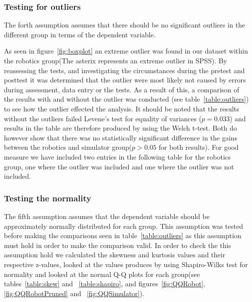 \subsubsection*{Testing for outliers}\label{sec:outliers}
The forth assumption assumes that there should be no significant outliers in the different group in terms of the dependent variable. 


\bigskip\noindent
As seen in figure~\ref{fig:boxplot} an extreme outlier was found in our dataset within the robotics group(The asterix represents an extreme outlier in SPSS). 
By reassessing the tests, and investigating the circumstances during the pretest and posttest it was determined that the outlier were most likely not caused by errors during assessment, data entry or the tests. 
As a result of this, a comparison of the results with and without the outlier was conducted (see table~\ref{table:outliers}) to see how the outlier effected the analysis. 
It should be noted that the results without the outliers failed Levene's test for equality of variances ($p = 0.033$) and results in the table are therefore produced by using the Welch t-test. 
Both do however show that there was no statistically significant difference in the gains between the robotics and simulator group($p > 0.05$ for both results).
For good measure we have included two entries in the following table for the robotics group, one where the outlier was included and one where the outlier was not included.


\bigskip\noindent
{}

\subsubsection*{Testing the normality}\label{sec:normality}
The fifth assumption assumes that the dependent variable should be approximately normally distributed for each group. This assumption was tested before making the comparisons seen in table~\ref{table:outliers} as this assumption must hold in order to make the comparison valid. 
In order to check the this assumption hold we calculated the skewness and kurtosis values and their respective z-values, looked at the values produces by using Shapiro-Wilks test for normality and looked at the normal Q-Q plots for each group(see tables~\ref{table:skew} and ~\ref{table:shapiro}, and figures~\ref{fig:QQRobot},\ref{fig:QQRobotPruned} and ~\ref{fig:QQSimulator}).

